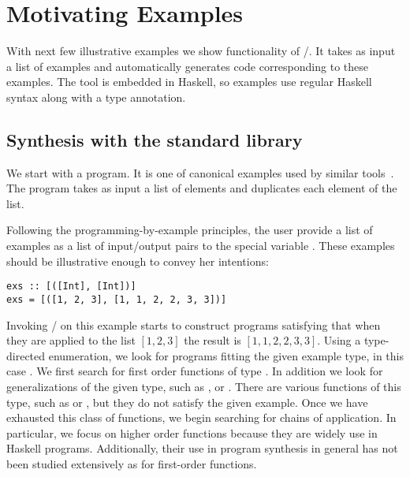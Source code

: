 \section{Motivating Examples} 
\label{examples}

With next few illustrative examples we show functionality of \ourTool/.
It takes as input a list of examples and automatically generates code
corresponding to these examples. The tool is embedded in Haskell, so examples use regular Haskell syntax along with a type annotation.



\subsection{Synthesis with the standard library}
\label{sec:exampleBasic}

We start with a  program. It is one of canonical 
examples used by similar tools~\cite{Osera:2015}. The  program takes as input a list of elements and duplicates each element 
of the list.
 
Following the programming-by-example principles, the user 
provide a list of examples as a list of input/output pairs to the special variable . These examples should be
illustrative enough to convey her intentions:

\begin{lstlisting}
exs :: [([Int], [Int])]
exs = [([1, 2, 3], [1, 1, 2, 2, 3, 3])]
\end{lstlisting}

Invoking \ourTool/ on this example starts to construct programs  satisfying that when they are applied to the list $[1, 2, 3]$ the result 
is $[1, 1, 2, 2, 3, 3]$.
Using a type-directed enumeration, we look for programs fitting the given example type, in this case \codeinline{[Int]->[Int]}.
We first search for first order functions of type \codeinline{[Int]->[Int]}.
In addition we look for generalizations of the given type, such as \codeinline{[a]->[a]}, or .
There are various functions of this type, such as  or , but they do not satisfy the given example.
Once we have exhausted this class of functions, we begin searching for chains of application.
In particular, we focus on higher order functions because they are widely use in Haskell programs. Additionally, their use in program synthesis 
in general has not been studied extensively as for first-order functions.

